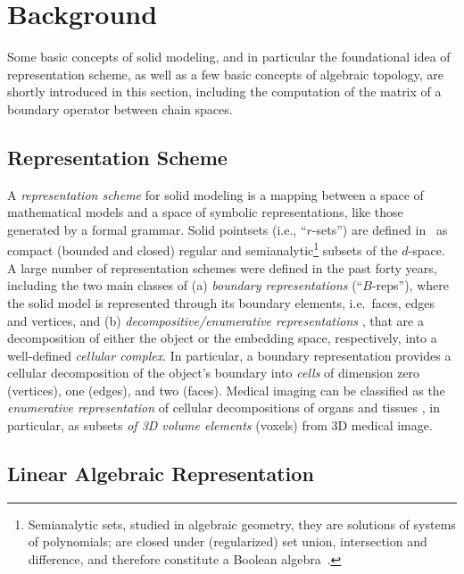 
\section{Background}\label{sec:background}

Some basic concepts of solid modeling, and in particular the foundational idea of representation scheme, as well as a few basic concepts of algebraic topology, are shortly introduced in this section, including the computation of the matrix of a boundary operator between chain spaces.

\subsection{Representation Scheme}\label{sec:schemes}

A \emph{representation scheme} for solid modeling is a mapping between a space of mathematical models and a space of symbolic representations, like those generated by a formal grammar.
Solid pointsets (i.e., ``$r$-sets'') are defined in~\cite{Requicha:1980:RRS:356827.356833} as compact (bounded and closed) regular and semianalytic\footnote{Semianalytic sets, studied in algebraic geometry, they are solutions of systems of polynomials; are closed under (regularized) set union, intersection and difference, and therefore constitute a Boolean algebra~\cite{2019arXiv191011848P}.} subsets of the $d$-space. A large number of representation schemes were defined in the past forty years, including the two main classes of (a) \emph{boundary representations} (``$B$-reps''), where the solid model is represented through its boundary elements, i.e.~faces, edges and vertices, and (b) \emph{decompositive/enumerative representations} \cite{Requicha:1980:RRS:356827.356833}, that are a decomposition of either the object or the embedding space, respectively, into a well-defined \emph{cellular complex}. In particular, a boundary representation provides a cellular decomposition of the object's boundary into \emph{cells} of dimension zero (vertices), one (edges), and two (faces). Medical imaging can be classified as the \emph{enumerative representation} of cellular decompositions of organs and tissues \cite{Paoluzzi2016}, in particular, as subsets \emph{of 3D volume elements} (voxels) from 3D medical image. 


\subsection{Linear Algebraic Representation}\label{sec:lar}


